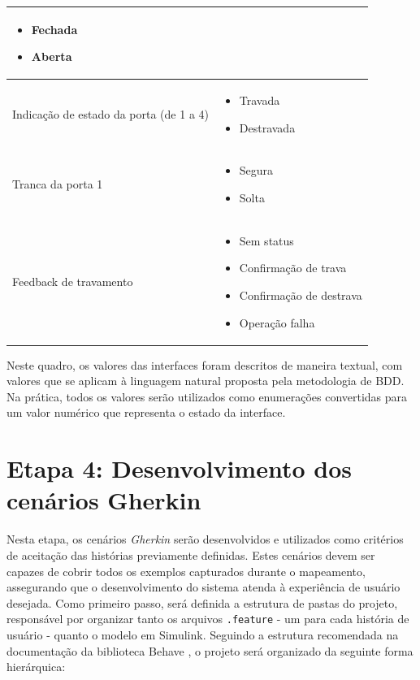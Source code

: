 \begin{quadro}[h]
\begin{tabular}{|p{5cm}|p{7cm}|}
\begin{itemize}[topsep=0pt, partopsep=0pt, leftmargin=*]
    \item Fechada
    \item Aberta
\end{itemize} \\
\hline
Indicação de estado da porta (de 1 a 4) &
\begin{itemize}[topsep=0pt, partopsep=0pt, leftmargin=*]
    \item Travada
    \item Destravada
\end{itemize} \\
\hline
Tranca da porta 1 &
\begin{itemize}[topsep=0pt, partopsep=0pt, leftmargin=*]
    \item Segura
    \item Solta
\end{itemize} \\
\hline
Feedback de travamento &
\begin{itemize}[topsep=0pt, partopsep=0pt, leftmargin=*]
    \item Sem status
    \item Confirmação de trava
    \item Confirmação de destrava
    \item Operação falha
\end{itemize} \\
\hline
\end{tabular}
\end{quadro}

Neste quadro, os valores das interfaces foram descritos de maneira textual, com valores que se aplicam à linguagem natural proposta pela metodologia de BDD. 
Na prática, todos os valores serão utilizados como enumerações convertidas para um valor numérico que representa o estado da interface.

\section{\textbf{Etapa 4: Desenvolvimento dos cenários Gherkin}}
\label{sbs:etapa4}
Nesta etapa, os cenários \textit{Gherkin} serão desenvolvidos e utilizados como critérios de aceitação das histórias previamente definidas. Estes cenários devem ser capazes 
de cobrir todos os exemplos capturados durante o mapeamento, assegurando que o desenvolvimento do sistema atenda à experiência de usuário desejada.
Como primeiro passo, será definida a estrutura de pastas do projeto, responsável por organizar tanto os arquivos \texttt{.feature} - um para cada história de usuário - 
quanto o modelo em Simulink. Seguindo a estrutura recomendada na documentação da biblioteca Behave \cite{behaveDocs}, o projeto será organizado da seguinte forma hierárquica:

